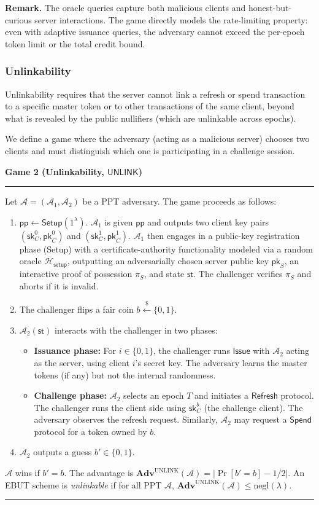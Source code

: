 \documentclass[11pt]{article}
\theoremstyle{definitionstyle}
\theoremstyle{plain}
\newenvironment{game}[2][]
  {\par\addvspace{\topsep}\noindent\textbf{Game #2}\ #1\par\nobreak\smallskip\hrule\smallskip}
  {\hrule\par\addvspace{\topsep}}
\newcommand{\advantage}[1]{\mathbf{Adv}^{\mathrm{#1}}}
\newcommand{\negl}{\mathrm{negl}}
\begin{document}
\noindent \textbf{Remark.} The oracle queries capture both malicious clients and honest-but-curious server interactions. The game directly models the rate-limiting property: even with adaptive issuance queries, the adversary cannot exceed the per-epoch token limit or the total credit bound.

\subsubsection{Unlinkability}
Unlinkability requires that the server cannot link a refresh or spend transaction to a specific master token or to other transactions of the same client, beyond what is revealed by the public nullifiers (which are unlinkable across epochs).

We define a game where the adversary (acting as a malicious server) chooses two clients and must distinguish which one is participating in a challenge session.

\begin{game}{2 (Unlinkability, $\mathsf{UNLINK}$)}
Let $\mathcal{A} = (\mathcal{A}_1, \mathcal{A}_2)$ be a PPT adversary. The game proceeds as follows:
\begin{enumerate}[leftmargin=*]
\item $\mathsf{pp} \leftarrow \mathsf{Setup}(1^\lambda)$. $\mathcal{A}_1$ is given $\mathsf{pp}$ and outputs two client key pairs $(\mathsf{sk}_C^0, \mathsf{pk}_C^0)$ and $(\mathsf{sk}_C^1, \mathsf{pk}_C^1)$. $\mathcal{A}_1$ then engages in a public-key registration phase (Setup) with a certificate-authority functionality modeled via a random oracle $\mathcal{H}_{\mathsf{setup}}$, outputting an adversarially chosen server public key $\mathsf{pk}_S$, an interactive proof of possession $\pi_S$, and state $\mathsf{st}$. The challenger verifies $\pi_S$ and aborts if it is invalid.
\item The challenger flips a fair coin $b \xleftarrow{\$} \{0,1\}$. 
\item $\mathcal{A}_2(\mathsf{st})$ interacts with the challenger in two phases:
  \begin{itemize}
  \item \textbf{Issuance phase:} For $i \in \{0,1\}$, the challenger runs $\mathsf{Issue}$ with $\mathcal{A}_2$ acting as the server, using client $i$'s secret key. The adversary learns the master tokens (if any) but not the internal randomness.
  \item \textbf{Challenge phase:} $\mathcal{A}_2$ selects an epoch $T$ and initiates a $\mathsf{Refresh}$ protocol. The challenger runs the client side using $\mathsf{sk}_C^b$ (the challenge client). The adversary observes the refresh request. Similarly, $\mathcal{A}_2$ may request a $\mathsf{Spend}$ protocol for a token owned by $b$.
  \end{itemize}
\item $\mathcal{A}_2$ outputs a guess $b' \in \{0,1\}$.
\end{enumerate}
$\mathcal{A}$ wins if $b' = b$. The advantage is $\advantage{UNLINK}(\mathcal{A}) = |\Pr[b' = b] - 1/2|$. An EBUT scheme is \emph{unlinkable} if for all PPT $\mathcal{A}$, $\advantage{UNLINK}(\mathcal{A}) \le \negl(\lambda)$.
\end{game}
\end{document}
